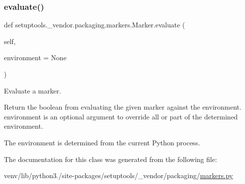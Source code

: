 \subsubsection{\texorpdfstring{evaluate()}{evaluate()}}
{\footnotesize\ttfamily def setuptools.\+\_\+vendor.\+packaging.\+markers.\+Marker.\+evaluate (\begin{DoxyParamCaption}\item[{}]{self,  }\item[{}]{environment = {\ttfamily None} }\end{DoxyParamCaption})}

\begin{DoxyVerb}Evaluate a marker.

Return the boolean from evaluating the given marker against the
environment. environment is an optional argument to override all or
part of the determined environment.

The environment is determined from the current Python process.
\end{DoxyVerb}
 

The documentation for this class was generated from the following file\+:\begin{DoxyCompactItemize}
\item 
venv/lib/python3./site-\/packages/setuptools/\+\_\+vendor/packaging/\hyperlink{setuptools_2__vendor_2packaging_2markers_8py}{markers.\+py}\end{DoxyCompactItemize}
